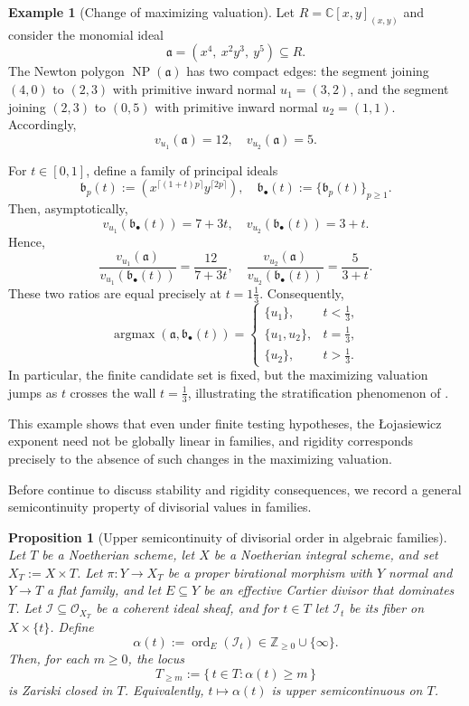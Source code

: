 \documentclass[12pt]{amsart}
\newcommand{\ZZ}{\mathbb{Z}}
\newcommand{\CC}{\mathbb{C}}
\newcommand{\ord}{\operatorname{\mathrm{ord}}}
\renewcommand{\a}{\mathfrak{a}}
\renewcommand{\b}{\mathfrak{b}}
\newcommand{\cI}{\mathcal{I}}
\newcommand{\cO}{\mathcal{O}}
\DeclareMathOperator{\argmax}{argmax}
\DeclareMathOperator{\NP}{NP}
\newcommand{\bbul}{{\b_\bullet}}
\theoremstyle{plain}
\newtheorem{proposition}[theorem]{Proposition}
\theoremstyle{definition}
\newtheorem{example}[theorem]{Example}
\numberwithin{equation}{section}
\begin{document}
\begin{example}[Change of maximizing valuation]\label{ex:change-maximizer}
	Let $R=\CC[x,y]_{(x,y)}$ and consider the monomial ideal
	\[
	\a=(x^4,\ x^2y^3,\ y^5)\subseteq R.
	\]
	The Newton polygon $\NP(\a)$ has two compact edges: the segment joining
	$(4,0)$ to $(2,3)$ with primitive inward normal $u_1=(3,2)$, and the segment
	joining $(2,3)$ to $(0,5)$ with primitive inward normal $u_2=(1,1)$.
	Accordingly,
	\[
	v_{u_1}(\a)=12,\quad v_{u_2}(\a)=5.
	\]
	
	For $t\in[0,1]$, define a family of principal ideals
	\[
	\b_p(t):=(x^{\lceil (1+t)p\rceil}y^{\lceil 2p\rceil}),\quad
	\bbul(t):=\{\b_p(t)\}_{p\ge1}.
	\]
	Then, asymptotically,
	\[
	v_{u_1}(\bbul(t))=7+3t,\quad
	v_{u_2}(\bbul(t))=3+t.
	\]
	Hence,
	\[
	\frac{v_{u_1}(\a)}{v_{u_1}(\bbul(t))}=\frac{12}{7+3t},
	\quad
	\frac{v_{u_2}(\a)}{v_{u_2}(\bbul(t))}=\frac{5}{3+t}.
	\]
	These two ratios are equal precisely at $t=1\frac{1}{3}$. Consequently,
	\[
	\argmax(\a,\bbul(t))=
	\begin{cases}
		\{u_1\}, & t<\frac13,\\[4pt]
		\{u_1,u_2\}, & t=\frac13,\\[4pt]
		\{u_2\}, & t>\frac13.
	\end{cases}
	\]
	In particular, the finite candidate set is fixed, but the maximizing valuation
	jumps as $t$ crosses the wall $t=\frac13$, illustrating the stratification
	phenomenon of .
\end{example}


This example shows that even under finite testing hypotheses,
the \L{}ojasiewicz exponent need not be globally linear in families,
and rigidity corresponds precisely to the absence of such changes
in the maximizing valuation.


Before continue to discuss stability and rigidity consequences, we record a general semicontinuity property of divisorial values in families.

\begin{proposition}[Upper semicontinuity of divisorial order in algebraic families]\label{prop:divisorial-usc}
	Let $T$ be a Noetherian scheme, let $X$ be a Noetherian integral scheme, and set $X_T:=X\times T$.
	Let $\pi:Y\to X_T$ be a proper birational morphism with $Y$ normal and $Y \to T$ a flat family, and let $E\subseteq Y$ be an effective Cartier divisor that dominates $T$. Let $\cI\subseteq \cO_{X_T}$ be a coherent ideal sheaf, and for $t\in T$ let $\cI_t$ be its fiber on $X\times\{t\}$.
	Define
	\[
	\alpha(t):=\ord_E(\cI_t)\in \ZZ_{\ge 0}\cup\{\infty\}.
	\]
	Then, for each $m\ge 0$, the locus
	\[
	T_{\ge m}:=\{\,t\in T:\alpha(t)\ge m\,\}
	\]
	is Zariski closed in $T$. Equivalently, $t\mapsto \alpha(t)$ is upper semicontinuous on $T$.
\end{proposition}
\end{document}
